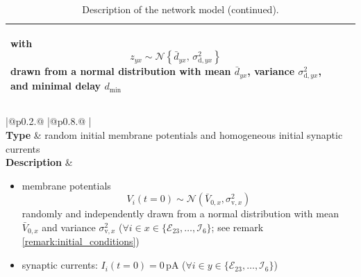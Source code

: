 \documentclass[10pt,a4paper,twoside,american]{article}
\theoremstyle{definitionstyle}
\begin{document}
\begin{table}
\begin{tabular}{
  |@{\hspace*{\marg}}p{}@{\hspace*{\marg}}
  |@{\hspace*{\marg}}p{}@{\hspace*{\marg}}
  |}
\begin{itemize}
\begin{equation}
  \end{equation}
  with
  \begin{equation}
      z_{yx} \sim\mathcal{N}\left\{\bar{d}_{yx},\,\sigma_{\text{d},yx}^2\right\}
  \end{equation}
  drawn from a normal distribution with mean $\bar{d}_{yx}$, variance $\sigma_{\text{d},yx}^2$, and minimal delay $d_\text{min}$
  \end{itemize}\\
  \hline
\end{tabular}
\begin{tabular}{
  |@{\hspace*{\marg}}p{}@{\hspace*{\marg}}
  |@{\hspace*{\marg}}p{}@{\hspace*{\marg}}
  |}
  \hline
  \\
\hline
\textbf{Type} & random initial membrane potentials and homogeneous initial synaptic currents\\
\hline
  \textbf{Description} &
  \begin{itemize}
  \item membrane potentials
    \begin{equation}
      V_i(t=0)\sim\mathcal{N}(\bar{V}_{0,x},\sigma_{\text{v},x}^2)
    \end{equation}
  randomly and independently drawn from a normal distribution with mean $\bar{V}_{0,x}$ and variance $\sigma^2_{\text{v},x}$ ($\forall i \in x\in\{\mathcal{E}_{23},\ldots,\mathcal{I}_{6}\}$; see remark \ref{remark:initial_conditions})
  \item synaptic currents: $I_{i}(t=0)=0\,\text{pA}$ ($\forall i \in y\in\{\mathcal{E}_{23},\ldots,\mathcal{I}_{6}\}$)
  \end{itemize}\\
  \hline
\end{tabular}
\caption{Description of the network model (continued).}
\end{table}
\clearpage
\end{document}

